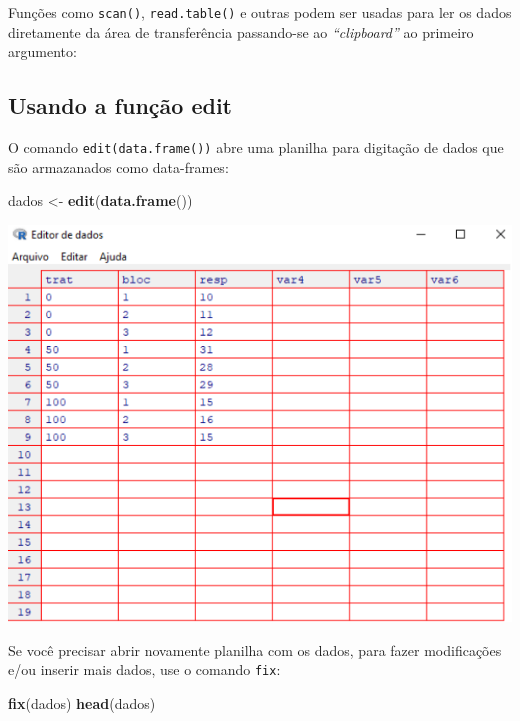 \documentclass[
]{book}
\newenvironment{Shaded}{\begin{snugshade}}{\end{snugshade}}
\newcommand{\KeywordTok}[1]{\textcolor[rgb]{0.13,0.29,0.53}{\textbf{#1}}}
\newcommand{\NormalTok}[1]{#1}
\newcommand{\StringTok}[1]{\textcolor[rgb]{0.31,0.60,0.02}{#1}}
\begin{document}
Funções como \texttt{scan()}, \texttt{read.table()} e outras podem ser usadas para ler os dados diretamente da área de transferência passando-se ao \emph{``clipboard''} ao primeiro argumento:

\hypertarget{usando-a-funuxe7uxe3o-edit}{%
\subsection{Usando a função edit}\label{usando-a-funuxe7uxe3o-edit}}

O comando \texttt{edit(data.frame())} abre uma planilha para digitação de dados que são armazanados como data-frames:

\begin{Shaded}
\begin{Highlighting}[]
\NormalTok{dados <-}\StringTok{ }\KeywordTok{edit}\NormalTok{(}\KeywordTok{data.frame}\NormalTok{())}
\end{Highlighting}
\end{Shaded}

\includegraphics[width=8.26in]{image/scan1}

Se você precisar abrir novamente planilha com os dados, para fazer modificações e/ou inserir mais dados, use o comando \texttt{fix}:

\begin{Shaded}
\begin{Highlighting}[]
\KeywordTok{fix}\NormalTok{(dados)}
\KeywordTok{head}\NormalTok{(dados)}
\end{Highlighting}
\end{Shaded}
\end{document}

